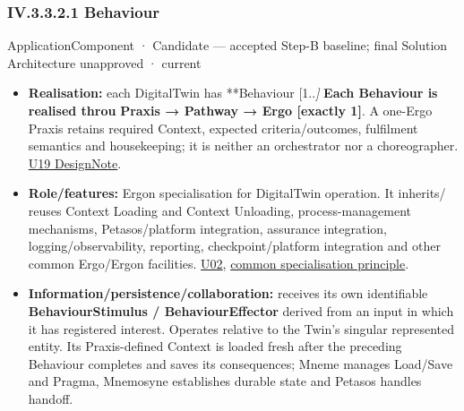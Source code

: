 \subsubsection*{IV.3.3.2.1 Behaviour}
\label{navigation:IV.3.3.2.1}

\label{element:a26f06d66bec4981b266e202c46a9afb}
{\small ApplicationComponent · Candidate — accepted Step-B baseline; final Solution Architecture unapproved · current}\par

\begin{itemize}


\item \textbf{Realisation:} each DigitalTwin has **Behaviour [1..\emph{]}\textbf{ Each Behaviour is
  realised throu} \textbf{Praxis → Pathway → Ergo [exactly 1]}. A one-Ergo Praxis
  retains required Context, expected criteria/outcomes, fulfilment semantics and
  housekeeping; it is neither an orchestrator nor a choreographer.
  \href{\detokenize{../../../../../docs/markdown/05-information-systems-architecture/design-notes/DesignNote-Digital-Twin-Behaviour-and-Execution-Semantics.md}}{U19 DesignNote}.

\item \textbf{Role/features:} Ergon specialisation for DigitalTwin operation. It inherits/
  reuses Context Loading and Context Unloading, process-management mechanisms,
  Petasos/platform integration, assurance integration, logging/observability,
  reporting, checkpoint/platform integration and other common Ergo/Ergon facilities.
  \href{\detokenize{../../../../../docs/markdown/05-information-systems-architecture/sources.md#u02}}{U02}, \href{\detokenize{../../../../../docs/markdown/05-information-systems-architecture/README.md#specialisation-principle}}{common specialisation principle}.

\item \textbf{Information/persistence/collaboration:} receives its own identifiable
  \textbf{BehaviourStimulus / BehaviourEffector} derived from an input in which it has
  registered interest. Operates relative to the Twin's singular represented
  entity. Its Praxis-defined Context is loaded fresh after the preceding
  Behaviour completes and saves its consequences; Mneme manages Load/Save and
  Pragma, Mnemosyne establishes durable state and Petasos handles handoff.


\end{itemize}
